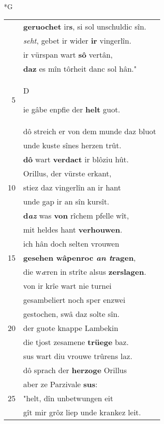 \documentclass[8pt,a4paper,notitlepage]{article}
\begin{document}
\newpage
\begin{table}[ht]
\begin{minipage}[t]{0.5\linewidth}
\small
\begin{center}*G
\end{center}
\begin{tabular}{rl}
 & \textbf{geruochet} ir\textbf{s}, si sol unschuldic sîn.\\ 
 & \textit{seht}, gebet ir wider \textbf{ir} vingerlîn.\\ 
 & ir vürspan wart \textbf{sô} vertân,\\ 
 & \textbf{daz} es mîn tôrheit danc sol hân."\\ 
5 & \begin{large}D\end{large}ie gâbe enpfie der \textbf{helt} guot.\\ 
 & dô streich er von dem munde daz bluot\\ 
 & unde kuste sînes herzen trût.\\ 
 & \textbf{dô} wart \textbf{verdact} ir blôziu hût.\\ 
 & Orillus, der vürste erkant,\\ 
10 & stiez daz vingerlîn an ir hant\\ 
 & unde gap ir an sîn kursît.\\ 
 & \textbf{d\textit{az}} was \textbf{von} rîchem pfelle wît,\\ 
 & mit heldes hant \textbf{verhouwen}.\\ 
 & ich hân doch selten vrouwen\\ 
15 & \textbf{gesehen wâpenroc \textit{an t}ragen},\\ 
 & die w\textit{æ}ren in strîte alsus \textbf{zerslagen}.\\ 
 & von ir krîe wart nie turnei\\ 
 & gesambeliert noch sper enzwei\\ 
 & gestochen, swâ daz solte sîn.\\ 
20 & der guote knappe Lambekin\\ 
 & die tjost zesamene \textbf{trüege} baz.\\ 
 & sus wart diu vrouwe trûrens laz.\\ 
 & dô sprach der \textbf{herzoge} Orillus\\ 
 & aber ze Parzivale \textbf{sus}:\\ 
25 & "helt, dîn unbetwungen eit\\ 
 & gît mir grôz liep unde krankez leit.\\ 

\end{tabular}
\end{minipage}
\end{table}
\end{document}
